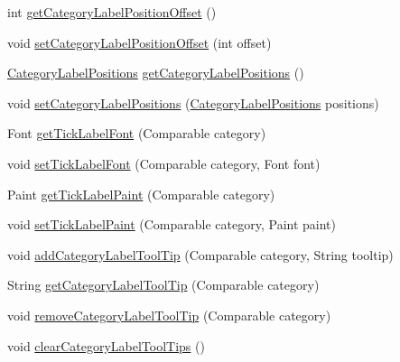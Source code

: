 \begin{DoxyCompactItemize}
int \mbox{\hyperlink{classorg_1_1jfree_1_1chart_1_1axis_1_1_category_axis_af2a6291aae8ed40cd31afb293c22fa5a}{get\+Category\+Label\+Position\+Offset}} ()
\item 
void \mbox{\hyperlink{classorg_1_1jfree_1_1chart_1_1axis_1_1_category_axis_a2672b78c9df6bac3f581e080fc10c3e8}{set\+Category\+Label\+Position\+Offset}} (int offset)
\item 
\mbox{\hyperlink{classorg_1_1jfree_1_1chart_1_1axis_1_1_category_label_positions}{Category\+Label\+Positions}} \mbox{\hyperlink{classorg_1_1jfree_1_1chart_1_1axis_1_1_category_axis_af6b7cf3f093f1d0e86f39e37ceed7231}{get\+Category\+Label\+Positions}} ()
\item 
void \mbox{\hyperlink{classorg_1_1jfree_1_1chart_1_1axis_1_1_category_axis_a6124e85b8233331b9cae0ee9d7c98e4b}{set\+Category\+Label\+Positions}} (\mbox{\hyperlink{classorg_1_1jfree_1_1chart_1_1axis_1_1_category_label_positions}{Category\+Label\+Positions}} positions)
\item 
Font \mbox{\hyperlink{classorg_1_1jfree_1_1chart_1_1axis_1_1_category_axis_a6b5dd23193a2c21cc442ca4bbfe6be48}{get\+Tick\+Label\+Font}} (Comparable category)
\item 
void \mbox{\hyperlink{classorg_1_1jfree_1_1chart_1_1axis_1_1_category_axis_aa352e3ac25d24cf67ec08c85d1417005}{set\+Tick\+Label\+Font}} (Comparable category, Font font)
\item 
Paint \mbox{\hyperlink{classorg_1_1jfree_1_1chart_1_1axis_1_1_category_axis_a3cda1e89a63b0151e4e61ff531f0018f}{get\+Tick\+Label\+Paint}} (Comparable category)
\item 
void \mbox{\hyperlink{classorg_1_1jfree_1_1chart_1_1axis_1_1_category_axis_a95b4a4ce7cdc45ad523e4c496908c924}{set\+Tick\+Label\+Paint}} (Comparable category, Paint paint)
\item 
void \mbox{\hyperlink{classorg_1_1jfree_1_1chart_1_1axis_1_1_category_axis_af13a9e516099c2898e94ccc1196a105e}{add\+Category\+Label\+Tool\+Tip}} (Comparable category, String tooltip)
\item 
String \mbox{\hyperlink{classorg_1_1jfree_1_1chart_1_1axis_1_1_category_axis_a394246317f649ea4082d3b279101cb1d}{get\+Category\+Label\+Tool\+Tip}} (Comparable category)
\item 
void \mbox{\hyperlink{classorg_1_1jfree_1_1chart_1_1axis_1_1_category_axis_aeaffa3c7cecfeacf63ef280d29216bbd}{remove\+Category\+Label\+Tool\+Tip}} (Comparable category)
\item 
void \mbox{\hyperlink{classorg_1_1jfree_1_1chart_1_1axis_1_1_category_axis_ac759f3965ef290addcff7b607c559a3e}{clear\+Category\+Label\+Tool\+Tips}} ()

\end{DoxyCompactItemize}
